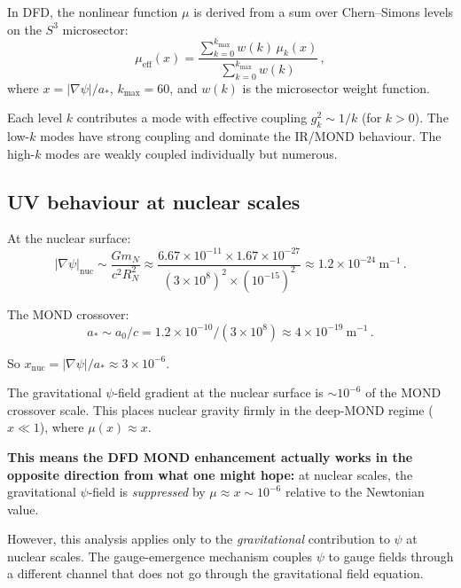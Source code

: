 \documentclass[aps,prd,twocolumn,superscriptaddress,floatfix,nofootinbib]{revtex4-2}
\newcommand{\astar}{a_*}
\newcommand{\mufunction}{\mu}
\newcommand{\mN}{m_N}
\begin{document}
In DFD, the nonlinear function $\mufunction$ is derived from a sum over
Chern--Simons levels on the $S^3$ microsector:
\begin{equation}
\mufunction_{\mathrm{eff}}(x) = \frac{\sum_{k=0}^{k_{\max}} w(k) \,
\mufunction_k(x)}{\sum_{k=0}^{k_{\max}} w(k)} \, ,
\label{eq:mu_eff}
\end{equation}
where $x = |\nabla\psi|/\astar$, $k_{\max} = 60$, and $w(k)$ is the
microsector weight function.

Each level $k$ contributes a mode with effective coupling $g_k^2 \sim 1/k$
(for $k > 0$). The low-$k$ modes have strong coupling and dominate the
IR/MOND behaviour. The high-$k$ modes are weakly coupled individually but
numerous.

\subsection{UV behaviour at nuclear scales}\label{sec:UV_nuclear}

At the nuclear surface:
\begin{equation}
|\nabla\psi|_{\mathrm{nuc}} \sim \frac{G \mN}{c^2 R_N^2}
\approx \frac{6.67 \times 10^{-11} \times 1.67 \times 10^{-27}}
{(3 \times 10^8)^2 \times (10^{-15})^2}
\approx 1.2 \times 10^{-24}~\text{m}^{-1} \, .
\label{eq:grad_psi_nuc}
\end{equation}

The MOND crossover:
\begin{equation}
\astar \sim a_0/c = 1.2 \times 10^{-10}/(3 \times 10^8)
\approx 4 \times 10^{-19}~\text{m}^{-1} \, .
\label{eq:astar}
\end{equation}

So $x_{\mathrm{nuc}} = |\nabla\psi|/\astar \approx 3 \times 10^{-6}$.

\begin{tcolorbox}[colback=yellow!5!white, colframe=yellow!50!black,
  title=Nuclear $\psi$-gradient is sub-MOND]
The gravitational $\psi$-field gradient at the nuclear surface is
$\sim 10^{-6}$ of the MOND crossover scale. This places nuclear gravity
firmly in the deep-MOND regime ($x \ll 1$), where
$\mufunction(x) \approx x$.

\textbf{This means the DFD MOND enhancement actually works in the
opposite direction from what one might hope:} at nuclear scales, the
gravitational $\psi$-field is \emph{suppressed} by $\mufunction \approx
x \sim 10^{-6}$ relative to the Newtonian value.

However, this analysis applies only to the \emph{gravitational} contribution
to $\psi$ at nuclear scales. The gauge-emergence mechanism couples $\psi$
to gauge fields through a different channel that does not go through the
gravitational field equation.
\end{tcolorbox}
\end{document}
